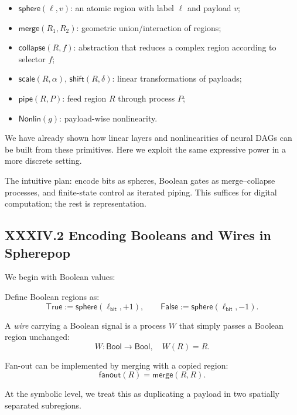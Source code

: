 \documentclass[12pt,letterpaper]{article}
\begin{document}
\begin{itemize}
  \item $\mathsf{sphere}(\ell, v)$: an atomic region with label $\ell$ and payload $v$;
  \item $\mathsf{merge}(R_1, R_2)$: geometric union/interaction of regions;
  \item $\mathsf{collapse}(R, f)$: abstraction that reduces a complex region according to selector $f$;
  \item $\mathsf{scale}(R, \alpha)$, $\mathsf{shift}(R, \delta)$: linear transformations of payloads;
  \item $\mathsf{pipe}(R, P)$: feed region $R$ through process $P$;
  \item $\mathsf{Nonlin}(g)$: payload-wise nonlinearity.
\end{itemize}

We have already shown how linear layers and nonlinearities of neural DAGs can be built from these primitives. Here we exploit the same expressive power in a more discrete setting.

The intuitive plan: encode bits as spheres, Boolean gates as merge--collapse processes, and finite-state control as iterated piping. This suffices for digital computation; the rest is representation.

\subsection{XXXIV.2 Encoding Booleans and Wires in Spherepop}

We begin with Boolean values:

\begin{definition}
Define Boolean regions as:
\[
\mathsf{True}  := \mathsf{sphere}(\ell_{\mathsf{bit}}, +1), \qquad
\mathsf{False} := \mathsf{sphere}(\ell_{\mathsf{bit}}, -1).
\]
\end{definition}

A \emph{wire} carrying a Boolean signal is a process $W$ that simply passes a Boolean region unchanged:
\[
W : \mathsf{Bool} \to \mathsf{Bool}, \quad W(R) = R.
\]

Fan-out can be implemented by merging with a copied region:
\[
\mathsf{fanout}(R) = \mathsf{merge}(R, R).
\]

At the symbolic level, we treat this as duplicating a payload in two spatially separated subregions.
\end{document}
